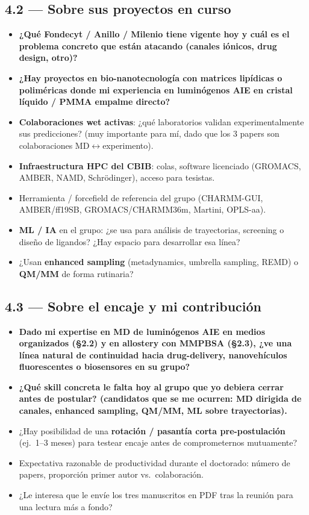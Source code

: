 \documentclass[11pt,a4paper]{article}
\newcommand{\pregunta}[1]{\item #1}
\newcommand{\prioritaria}[1]{\item \textbf{\textcolor{blue!70!black}{#1}}}
\begin{document}
\subsection*{4.2 --- Sobre sus proyectos en curso}
\begin{itemize}
    \prioritaria{¿Qué \textbf{Fondecyt / Anillo / Milenio} tiene vigente hoy y cuál es el problema concreto que están atacando (canales iónicos, drug design, otro)?}
    \prioritaria{¿Hay proyectos en \textbf{bio-nanotecnología con matrices lipídicas o poliméricas} donde mi experiencia en luminógenos AIE en cristal líquido / PMMA empalme directo?}
    \pregunta{\textbf{Colaboraciones wet activas}: ¿qué laboratorios validan experimentalmente sus predicciones? (muy importante para mí, dado que los 3 papers son colaboraciones MD$\leftrightarrow$experimento).}
    \pregunta{\textbf{Infraestructura HPC del CBIB}: colas, software licenciado (GROMACS, AMBER, NAMD, Schrödinger), acceso para tesistas.}
    \pregunta{Herramienta / forcefield de referencia del grupo (CHARMM-GUI, AMBER/ff19SB, GROMACS/CHARMM36m, Martini, OPLS-aa).}
    \pregunta{\textbf{ML / IA} en el grupo: ¿se usa para análisis de trayectorias, screening o diseño de ligandos? ¿Hay espacio para desarrollar esa línea?}
    \pregunta{¿Usan \textbf{enhanced sampling} (metadynamics, umbrella sampling, REMD) o \textbf{QM/MM} de forma rutinaria?}
\end{itemize}

\subsection*{4.3 --- Sobre el encaje y mi contribución}
\begin{itemize}
    \prioritaria{Dado mi expertise en MD de \textbf{luminógenos AIE en medios organizados} (\S2.2) y en \textbf{allostery con MMPBSA} (\S2.3), ¿ve una línea natural de continuidad hacia \textbf{drug-delivery, nanovehículos fluorescentes o biosensores} en su grupo?}
    \prioritaria{¿Qué \textbf{skill concreta} le falta hoy al grupo que yo debiera cerrar antes de postular? (candidatos que se me ocurren: MD dirigida de canales, enhanced sampling, QM/MM, ML sobre trayectorias).}
    \pregunta{¿Hay posibilidad de una \textbf{rotación / pasantía corta pre-postulación} (ej.\ 1--3 meses) para testear encaje antes de comprometernos mutuamente?}
    \pregunta{Expectativa razonable de productividad durante el doctorado: número de papers, proporción primer autor vs.\ colaboración.}
    \pregunta{¿Le interesa que le envíe los tres manuscritos en PDF tras la reunión para una lectura más a fondo?}
\end{itemize}
\end{document}
